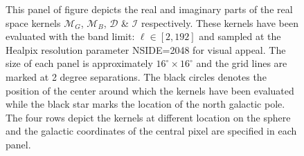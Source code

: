 \begin{figure}[t]
\caption{This panel of figure depicts the real and imaginary parts of the real space kernels $\mathcal{M}_{G}$, $\mathcal{M}_{B}$, $\mathcal{D}$ \& $\mathcal{I}$ respectively. These kernels have been evaluated with the band limit: $\ell \in [2,192]$ and sampled at the Healpix resolution parameter NSIDE=2048 for visual appeal. The size of each panel is approximately $16^{\circ} \times 16^{\circ}$ and the grid lines are marked at 2 degree separations. The black circles denotes the position of the center around which the kernels have been evaluated while the black star marks the location of the north galactic pole. The four rows depict the kernels at different location on the sphere and the galactic coordinates of the central pixel are specified in each panel.}
\label{fig:vis_kernel}
 \end{figure}
%


